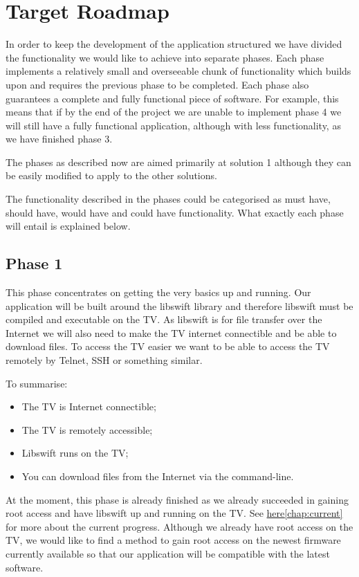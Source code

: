 \chapter{Target Roadmap}

In order to keep the development of the application structured we have divided the functionality 
we would like to achieve into separate phases. 
Each phase implements a relatively small and overseeable chunk of functionality 
which builds upon and requires the previous phase to be completed. 
Each phase also guarantees a complete and fully functional piece of software. 
For example, this means that if by the end of the project we are unable to implement phase 4 we will 
still have a fully functional application, although with less functionality, as we have finished phase 3.

The phases as described now are aimed primarily at solution 1 although they can be easily modified to 
apply to the other solutions.

The functionality described in the phases could be categorised as must have, 
should have, would have and could have functionality.
What exactly each phase will entail is explained below.

\section{Phase 1}
This phase concentrates on getting the very basics up and running. 
Our application will be built around the libswift library and therefore 
libswift must be compiled and executable on the TV. 
As libswift is for file transfer over the Internet we will also need to make the 
TV internet connectible and be able to download files. 
To access the TV easier we want to be able to access the TV remotely by Telnet, SSH or something similar.

To summarise:

\begin{itemize}
\item The TV is Internet connectible;
\item The TV is remotely accessible;
\item Libswift runs on the TV;
\item You can download files from the Internet via the command-line.
\end{itemize}
At the moment, this phase is already finished as we already succeeded in gaining root access and 
have libswift up and running on the TV. See \hyperref[chap:current]{here\ref*{chap:current}} for more about the current progress.
Although we already have root access on the TV, 
we would like to find a method to gain root access on the newest firmware currently 
available so that our application will be compatible with the latest software. 

